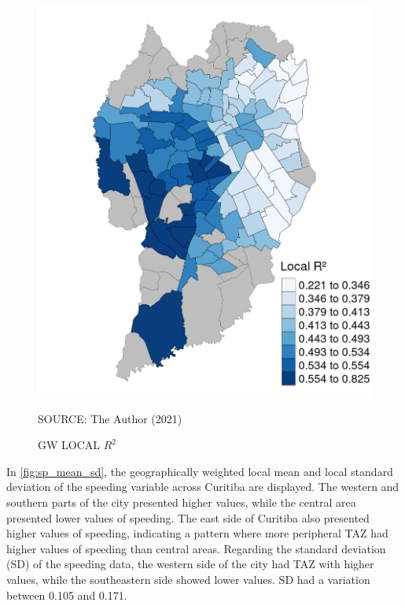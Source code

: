 
\begin{figure}[!htbp]
    \centering\footnotesize
    \captionsetup{font=footnotesize}
    \caption{GW LOCAL $R^2$}
    \includegraphics{fig/r2_map.png}
    \label{fig:r2_map}
    \par SOURCE: The Author (2021)
\end{figure}

In \autoref{fig:sp_mean_sd}, the geographically weighted local mean and local standard deviation of the speeding variable across Curitiba are displayed. The western and southern parts of the city presented higher values, while the central area presented lower values of speeding. The east side of Curitiba also presented higher values of speeding, indicating a pattern where more peripheral TAZ had higher values of speeding than central areas. Regarding the standard deviation (SD) of the speeding data, the western side of the city had TAZ with higher values, while the southeastern side showed lower values. SD had a variation between 0.105 and 0.171.  



